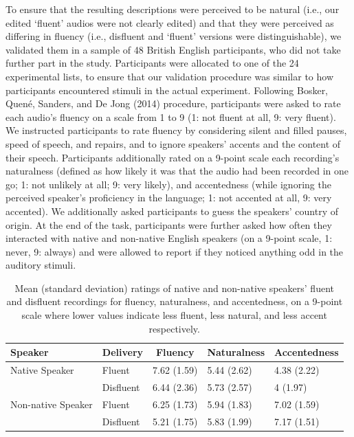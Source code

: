 \documentclass[
  man,floatsintext]{apa7}
\begin{document}
To ensure that the resulting descriptions were perceived to be natural (i.e., our edited `fluent' audios were not clearly edited) and that they were perceived as differing in fluency (i.e., disfluent and `fluent' versions were distinguishable), we validated them in a sample of 48 British English participants, who did not take further part in the study. Participants were allocated to one of the 24 experimental lists, to ensure that our validation procedure was similar to how participants encountered stimuli in the actual experiment. Following Bosker, Quené, Sanders, and De Jong (2014) procedure, participants were asked to rate each audio's fluency on a scale from 1 to 9 (1: not fluent at all, 9: very fluent). We instructed participants to rate fluency by considering silent and filled pauses, speed of speech, and repairs, and to ignore speakers' accents and the content of their speech. Participants additionally rated on a 9-point scale each recording's naturalness (defined as how likely it was that the audio had been recorded in one go; 1: not unlikely at all; 9: very likely), and accentedness (while ignoring the perceived speaker's proficiency in the language; 1: not accented at all, 9: very accented). We additionally asked participants to guess the speakers' country of origin. At the end of the task, participants were further asked how often they interacted with native and non-native English speakers (on a 9-point scale, 1: never, 9: always) and were allowed to report if they noticed anything odd in the auditory stimuli.

\begin{table}[tbp]

\begin{center}
\begin{threeparttable}

\caption{\label{tab:tab-results-validation}Mean (standard deviation) ratings of native and non-native speakers’ fluent and disfluent
recordings for fluency, naturalness, and accentedness, on a 9-point scale where lower values indicate
less fluent, less natural, and less accent respectively.}

\begin{tabular}{lllll}
\toprule
Speaker & \multicolumn{1}{c}{Delivery} & \multicolumn{1}{c}{Fluency} & \multicolumn{1}{c}{Naturalness} & \multicolumn{1}{c}{Accentedness}\\
\midrule
Native Speaker & Fluent & 7.62 (1.59) & 5.44 (2.62) & 4.38 (2.22)\\
 & Disfluent & 6.44 (2.36) & 5.73 (2.57) & 4 (1.97)\\
Non-native Speaker & Fluent & 6.25 (1.73) & 5.94 (1.83) & 7.02 (1.59)\\
 & Disfluent & 5.21 (1.75) & 5.83 (1.99) & 7.17 (1.51)\\
\bottomrule
\end{tabular}

\end{threeparttable}
\end{center}

\end{table}
\end{document}
